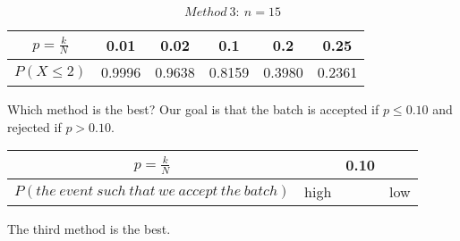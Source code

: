 \documentclass[letterpaper, 12pt]{math}
\begin{document}
\[ Method\ 3:\ n = 15 \]
\begin{center}
  \begin{tabular}{|c|c|c|c|c|c|}
    \hline
    \( p = \frac{k}{N} \) & 0.01 & 0.02 & 0.1 & 0.2 & 0.25 \\
    \hline
    \( P(X\leq 2) \) & 0.9996 & 0.9638 & 0.8159 & 0.3980 & 0.2361 \\
    \hline
  \end{tabular}
\end{center}
Which method is the best? Our goal is that the batch is accepted if
\( p \leq 0.10 \) and rejected if \( p > 0.10 \).
\begin{center}
  \begin{tabular}{|c|c|c|c|}
    \hline
    \( p = \frac{k}{N} \) & & 0.10 & \\
    \hline
    \( P(the\ event\ such\ that\ we\ accept\ the\ batch) \) & high & & low \\
    \hline
  \end{tabular}
\end{center}
The third method is the best.
\end{document}
